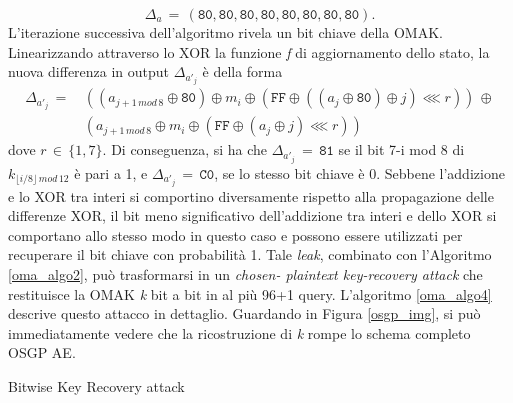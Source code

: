 \begin{equation*}
\Delta_a \, = \, (\texttt{80},\texttt{80},\texttt{80},\texttt{80},\texttt{80},\texttt{80},\texttt{80},\texttt{80}).
\end{equation*}
L'iterazione successiva dell'algoritmo rivela un bit chiave della OMAK. Linearizzando attraverso lo XOR la funzione \textit{f} di aggiornamento dello stato, la nuova differenza in output $\Delta_{a'_j}$ è della forma
\begin{equation*}
\begin{split}
\Delta_{a'_j} \, = \, & ((a_{j+1 \, mod \, 8} \oplus \texttt{80}) \oplus m_i \oplus (\texttt{FF} \oplus ((a_j \oplus \texttt{80}) \oplus j) \lll r)) \, \oplus \\
&(a_{j+1 \, mod \, 8} \oplus m_i \oplus (\texttt{FF} \oplus (a_j \oplus j) \lll r))
\end{split}
\end{equation*}
dove $r\,\in \, \{1,7\}$. Di conseguenza, si ha che $\Delta_{a'_j}\,=\,\texttt{81}$ se il bit 7-i mod 8 di $k_{\lfloor i/8 \rfloor \, mod \, 12}$ è pari a 1, e $\Delta_{a'_j}\,=\,\texttt{C0}$, se lo stesso bit chiave è 0. Sebbene l'addizione e lo XOR tra interi si comportino diversamente rispetto alla propagazione delle differenze XOR, il bit meno significativo dell'addizione tra interi e dello XOR si comportano allo stesso modo in questo caso e possono essere utilizzati per recuperare il bit chiave con probabilità 1. \newline
Tale \textit{leak}, combinato con l'Algoritmo \ref{oma_algo2}, può trasformarsi in un \textit{chosen- plaintext key-recovery attack} che restituisce la OMAK \textit{k} bit a bit in al più 96+1 query. L'algoritmo \ref{oma_algo4} descrive questo attacco in dettaglio. Guardando in Figura \ref{osgp_img}, si può immediatamente vedere che la ricostruzione di \textit{k} rompe lo schema completo OSGP AE.
\newpage
\begin{algorithm}[h]
\caption{Bitwise Key Recovery attack}
\label{oma_algo4}
\end{algorithm}
\newpage
